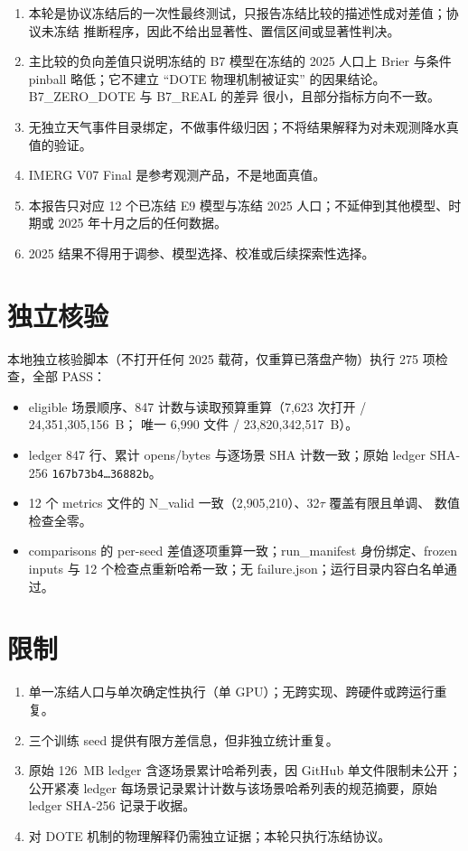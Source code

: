 \documentclass[UTF8,a4paper,fontset=windows,11pt]{ctexart}
\begin{document}
\begin{enumerate}
\item 本轮是协议冻结后的一次性最终测试，只报告冻结比较的描述性成对差值；协议未冻结
推断程序，因此不给出显著性、置信区间或显著性判决。
\item 主比较的负向差值只说明冻结的 B7 模型在冻结的 2025 人口上 Brier 与条件 pinball
略低；它不建立 ``DOTE 物理机制被证实'' 的因果结论。B7\_ZERO\_DOTE 与 B7\_REAL 的差异
很小，且部分指标方向不一致。
\item 无独立天气事件目录绑定，不做事件级归因；不将结果解释为对未观测降水真值的验证。
\item IMERG V07 Final 是参考观测产品，不是地面真值。
\item 本报告只对应 12 个已冻结 E9 模型与冻结 2025 人口；不延伸到其他模型、时期或
2025 年十月之后的任何数据。
\item 2025 结果不得用于调参、模型选择、校准或后续探索性选择。
\end{enumerate}

\section{独立核验}

本地独立核验脚本（不打开任何 2025 载荷，仅重算已落盘产物）执行 275 项检查，全部 PASS：

\begin{itemize}
\item eligible 场景顺序、847 计数与读取预算重算（7{,}623 次打开 / 24{,}351{,}305{,}156~B；
唯一 6{,}990 文件 / 23{,}820{,}342{,}517~B）。
\item ledger 847 行、累计 opens/bytes 与逐场景 SHA 计数一致；原始 ledger SHA-256
\texttt{167b73b4\ldots36882b}。
\item 12 个 metrics 文件的 N\_valid 一致（2{,}905{,}210）、32$\tau$ 覆盖有限且单调、
数值检查全零。
\item comparisons 的 per-seed 差值逐项重算一致；run\_manifest 身份绑定、frozen inputs 与
12 个检查点重新哈希一致；无 failure.json；运行目录内容白名单通过。
\end{itemize}

\section{限制}

\begin{enumerate}
\item 单一冻结人口与单次确定性执行（单 GPU）；无跨实现、跨硬件或跨运行重复。
\item 三个训练 seed 提供有限方差信息，但非独立统计重复。
\item 原始 126~MB ledger 含逐场景累计哈希列表，因 GitHub 单文件限制未公开；公开紧凑
ledger 每场景记录累计计数与该场景哈希列表的规范摘要，原始 ledger SHA-256 记录于收据。
\item 对 DOTE 机制的物理解释仍需独立证据；本轮只执行冻结协议。
\end{enumerate}
\end{document}
